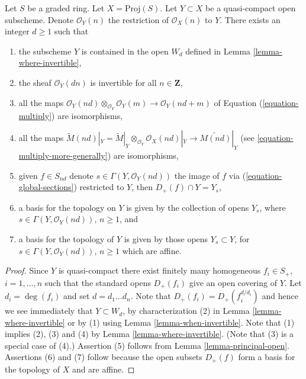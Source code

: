 \begin{lemma}
\label{lemma-ample-on-proj}
Let $S$ be a graded ring.
Let $X = \text{Proj}(S)$.
Let $Y \subset X$ be a quasi-compact open subscheme.
Denote $\mathcal{O}_Y(n)$ the restriction of
$\mathcal{O}_X(n)$ to $Y$.
There exists an integer $d \geq 1$ such that
\begin{enumerate}
\item the subscheme $Y$ is contained in the open $W_d$ defined
in Lemma \ref{lemma-where-invertible},
\item the sheaf $\mathcal{O}_Y(dn)$ is invertible for all $n \in \mathbf{Z}$,
\item all the maps
$\mathcal{O}_Y(nd) \otimes_{\mathcal{O}_Y} \mathcal{O}_Y(m)
\longrightarrow
\mathcal{O}_Y(nd + m)$
of Equation (\ref{equation-multiply}) are isomorphisms,
\item all the maps
$\widetilde M(nd)|_Y = \widetilde M|_Y \otimes_{\mathcal{O}_Y}
\mathcal{O}_X(nd)|_Y \to \widetilde{M(nd)}|_Y$
(see \ref{equation-multiply-more-generally}) are isomorphisms,
\item given $f \in S_{nd}$ denote $s \in \Gamma(Y, \mathcal{O}_Y(nd))$
the image of $f$ via (\ref{equation-global-sections})
restricted to $Y$, then $D_{+}(f) \cap Y = Y_s$,
\item a basis for the topology on $Y$ is given
by the collection of opens $Y_s$, where $s \in \Gamma(Y, \mathcal{O}_Y(nd))$,
$n \geq 1$, and
\item a basis for the topology of $Y$ is given
by those opens $Y_s \subset Y$, for
$s \in \Gamma(Y, \mathcal{O}_Y(nd))$, $n \geq 1$ which are affine.
\end{enumerate}
\end{lemma}

\begin{proof}
Since $Y$ is quasi-compact there exist finitely many homogeneous
$f_i \in S_{+}$, $i = 1, \ldots, n$ such that the standard opens
$D_{+}(f_i)$ give an open covering of $Y$. Let $d_i = \deg(f_i)$ and set
$d = d_1 \ldots d_n$. Note that $D_{+}(f_i) = D_{+}(f_i^{d/d_i})$
and hence we see immediately that $Y \subset W_d$, by characterization
(2) in Lemma \ref{lemma-where-invertible} or
by (1) using Lemma \ref{lemma-when-invertible}.
Note that (1) implies (2), (3) and (4) by Lemma \ref{lemma-where-invertible}.
(Note that (3) is a special case of (4).)
Assertion (5) follows from Lemma \ref{lemma-principal-open}.
Assertions (6) and (7) follow because the open subsets $D_{+}(f)$
form a basis for the topology of $X$ and are affine.
\end{proof}













